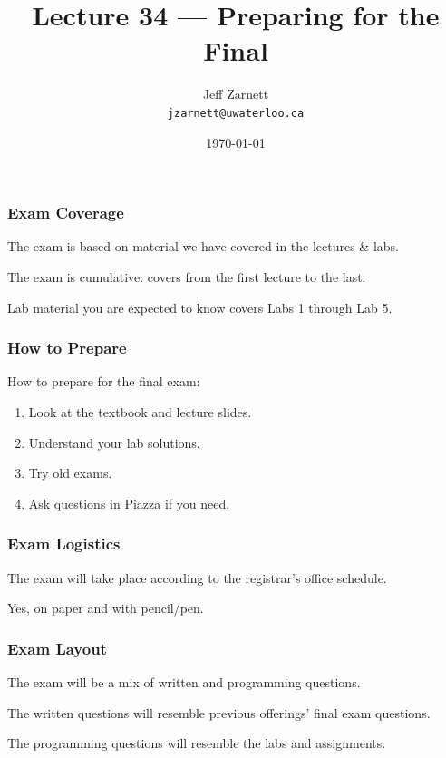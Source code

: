 

\title{Lecture 34 --- Preparing for the Final }

\author{Jeff Zarnett \\ \small \texttt{jzarnett@uwaterloo.ca}}
\date{\today}




\begin{frame}
  \titlepage

\end{frame}

\begin{frame}
\frametitle{Exam Coverage}

The exam is based on material we have covered in the lectures \& labs.

The exam is cumulative: covers from the first lecture to the last.

Lab material you are expected to know covers Labs 1 through Lab 5.

\end{frame}

\begin{frame}
\frametitle{How to Prepare}

How to prepare for the final exam:

\begin{enumerate}
	\item Look at the textbook and lecture slides.
	\item Understand your lab solutions.
	\item Try old exams.
	\item Ask questions in Piazza if you need.
\end{enumerate}

\end{frame}


\begin{frame}
\frametitle{Exam Logistics}

The exam will take place according to the registrar's office schedule.

Yes, on paper and with pencil/pen.

\end{frame}


\begin{frame}
\frametitle{Exam Layout}

The exam will be a mix of written and programming questions.

The written questions will resemble previous offerings' final exam questions.

The programming questions will resemble the labs and assignments.

\end{frame}


